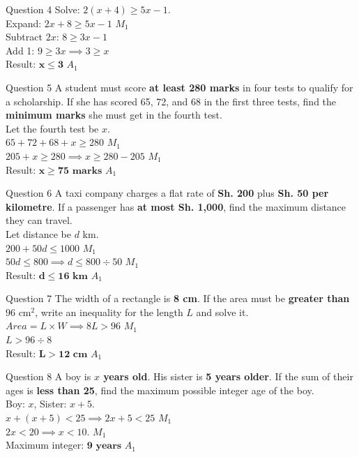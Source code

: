 \documentclass[12pt, a4paper, oneside]{article}
\begin{document}
\begin{solvingbox}{Question 4}
Solve: $2(x + 4) \geq 5x - 1$. \\
Expand: $2x + 8 \geq 5x - 1$ \hfill $M_1$ \\
Subtract $2x$: $8 \geq 3x - 1$ \\
Add 1: $9 \geq 3x \implies 3 \geq x$ \\
Result: $\mathbf{x \leq 3}$ \hfill $A_1$
\end{solvingbox}

\begin{solvingbox}{Question 5}
A student must score \textbf{at least 280 marks} in four tests to qualify for a scholarship. If she has scored 65, 72, and 68 in the first three tests, find the \textbf{minimum marks} she must get in the fourth test. \\
Let the fourth test be $x$. \\
$65 + 72 + 68 + x \geq 280$ \hfill $M_1$ \\
$205 + x \geq 280 \implies x \geq 280 - 205$ \hfill $M_1$ \\
Result: $\mathbf{x \geq 75 \text{ marks}}$ \hfill $A_1$
\end{solvingbox}

\begin{solvingbox}{Question 6}
A taxi company charges a flat rate of \textbf{Sh. 200} plus \textbf{Sh. 50 per kilometre}. If a passenger has \textbf{at most Sh. 1,000}, find the maximum distance they can travel. \\
Let distance be $d$ km. \\
$200 + 50d \leq 1000$ \hfill $M_1$ \\
$50d \leq 800 \implies d \leq 800 \div 50$ \hfill $M_1$ \\
Result: $\mathbf{d \leq 16 \text{ km}}$ \hfill $A_1$
\end{solvingbox}

\begin{solvingbox}{Question 7}
The width of a rectangle is \textbf{8 cm}. If the area must be \textbf{greater than $96\text{ cm}^2$}, write an inequality for the length $L$ and solve it. \\
$Area = L \times W \implies 8L > 96$ \hfill $M_1$ \\
$L > 96 \div 8$ \\
Result: $\mathbf{L > 12 \text{ cm}}$ \hfill $A_1$
\end{solvingbox}

\begin{solvingbox}{Question 8}
A boy is \textbf{$x$ years old}. His sister is \textbf{5 years older}. If the sum of their ages is \textbf{less than 25}, find the maximum possible integer age of the boy. \\
Boy: $x$, Sister: $x+5$. \\
$x + (x + 5) < 25 \implies 2x + 5 < 25$ \hfill $M_1$ \\
$2x < 20 \implies x < 10$. \hfill $M_1$ \\
Maximum integer: $\mathbf{9 \text{ years}}$ \hfill $A_1$
\end{solvingbox}
\end{document}
